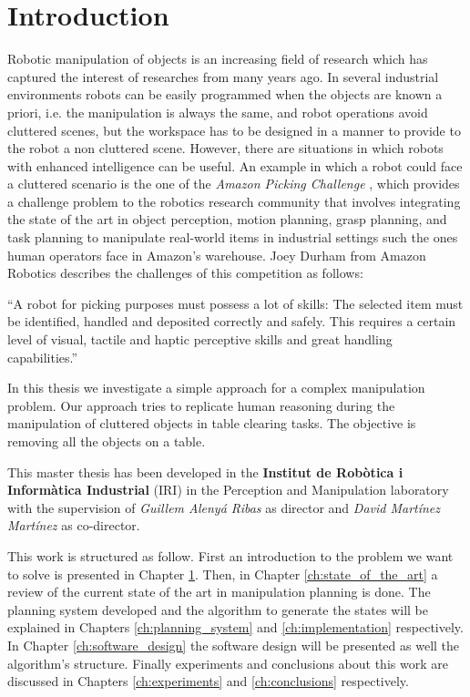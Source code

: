 
\chapter{Introduction}
\label{ch:introduction}

Robotic manipulation of objects is an increasing field of research which has captured the interest of researches from many years ago. In several industrial environments robots can be easily programmed when the objects are known a priori, i.e. the manipulation is always the same, and robot operations avoid cluttered scenes, but the workspace has to be designed in a manner to provide to the robot a non cluttered scene. However, there are situations in which robots with enhanced intelligence can be useful.
 An example in which a robot could face a cluttered scenario is the one of the \textit{Amazon Picking Challenge} \citep{APC}, which provides a challenge problem to the robotics research community that involves integrating the state of the art in object perception, motion planning, grasp planning, and task planning to manipulate real-world items in industrial settings such the ones human operators face in Amazon's warehouse. Joey Durham from Amazon Robotics describes the challenges of this competition as follows:
\begin{displayquote}
 “A robot for picking purposes must possess a lot of skills: The selected item must be identified, handled and deposited correctly and safely. This requires a certain level of visual, tactile and haptic perceptive skills and great handling capabilities.”
\end{displayquote}

In this thesis we investigate a simple approach for a complex manipulation problem. Our approach tries to replicate human reasoning during the manipulation of cluttered objects in table clearing tasks. The objective is removing all the objects on a table. 

This master thesis has been developed in the \textbf{Institut de Robòtica i Informàtica Industrial} (IRI) in the  Perception and Manipulation laboratory with the supervision of \textit{Guillem Alenyá Ribas} as director and \textit{David Martínez Martínez} as co-director. 


This work is structured as follow. First an introduction to the problem we want to solve is presented in Chapter \ref{ch:introduction}. Then, in Chapter \ref{ch:state_of_the_art} a review of the current state of the art in manipulation planning is done. The planning system developed and the algorithm to generate the states will be explained in Chapters \ref{ch:planning_system} and \ref{ch:implementation} respectively. In Chapter \ref{ch:software_design} the software design will be presented as well the algorithm's structure. Finally  experiments and conclusions about this work are discussed in Chapters \ref{ch:experiments} and \ref{ch:conclusions} respectively.

